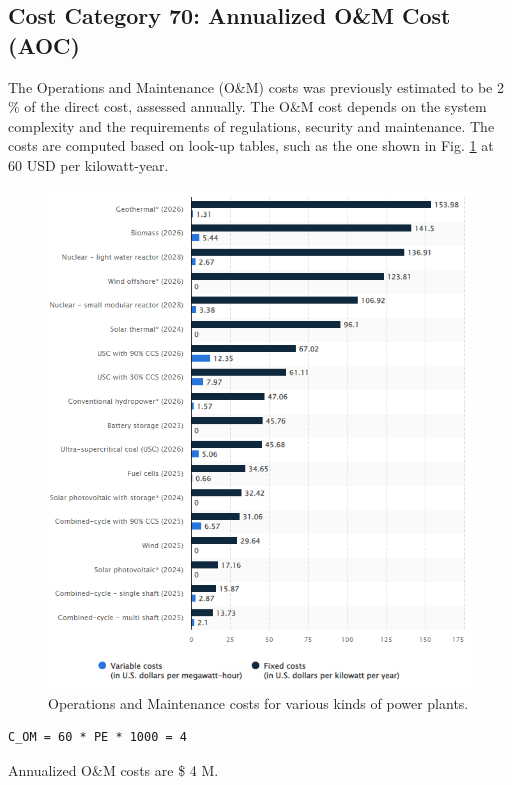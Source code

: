 \subsection{Cost Category 70: Annualized O\&M Cost (AOC)}

The Operations and Maintenance (O\&M) costs was previously estimated to be 2 \% of the direct cost, assessed annually.  The O\&M cost depends on the system complexity and the requirements of regulations, security and maintenance. The costs are computed based on look-up tables, such as the one shown in Fig. \ref{fig:statista} at 60 USD per kilowatt-year.  

\begin{figure}[b!] 
\centering 
\includegraphics[scale=0.5]{StandardFigures/statista.png} 
\caption{Operations and Maintenance costs for various kinds of power plants.} 
\label{fig:statista} 
\end{figure} 

\begin{verbatim} 
C_OM = 60 * PE * 1000 = 4  
\end{verbatim} 

Annualized O\&M costs are \$ 4 M.

